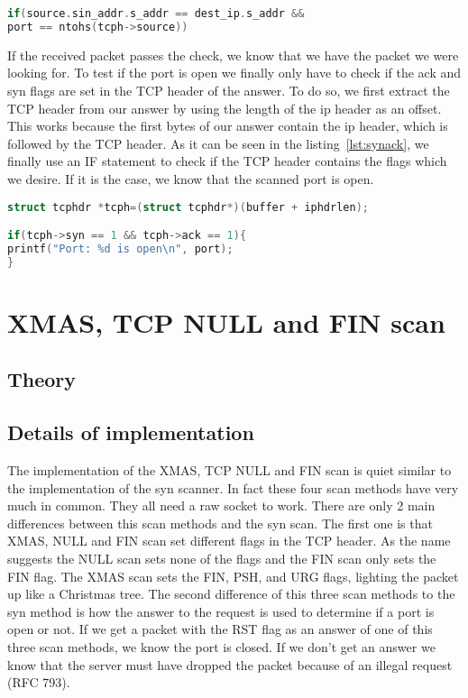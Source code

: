 \begin{lstlisting}[frame= single, language=C, caption= IF statement to check origin of packet, label=lst:checkorigin]
if(source.sin_addr.s_addr == dest_ip.s_addr &&
port == ntohs(tcph->source))
\end{lstlisting}
If the received packet passes the check, we know that we have the packet we were looking for. To test if the port is open we finally only have to check if the ack and syn flags are set in the TCP header
of the answer. To do so, we first extract the TCP header from our answer by using the length of the ip header as an offset. This works because the first bytes of our answer contain the ip header, which
is followed by the TCP header. As it can be seen in the listing~\ref{lst:synack}, we finally use an IF statement to check if the TCP header contains the flags which we desire. If it is the case, we know that the scanned
port is open.
\begin{lstlisting}[frame= single, language=C, caption=C code to check if answer contains syn and ack flag, label=lst:synack]
struct tcphdr *tcph=(struct tcphdr*)(buffer + iphdrlen);

if(tcph->syn == 1 && tcph->ack == 1){
printf("Port: %d is open\n", port);
} 
\end{lstlisting}
\section{XMAS, TCP NULL and FIN scan}
\label{sec:xmas}
\subsection{Theory}

\subsection{Details of implementation}
The implementation of the XMAS, TCP NULL and FIN scan is quiet similar to the implementation of the syn scanner. In fact these four scan methods have very much in common.
They all need a raw socket to work. There are only 2 main differences between this scan methods and the syn scan. The first one is that XMAS, NULL and FIN scan set different flags
in the TCP header. As the name suggests the NULL scan sets none of the flags and the FIN scan only sets the FIN flag. The XMAS scan sets the FIN, PSH, and URG flags, lighting the packet up like a Christmas tree.
The second difference of this three scan methods to the syn method is how the answer to the request is used to determine if a port is open or not. If we get a packet with the RST flag as an answer of one
of this three scan methods, we know the port is closed. If we don't get an answer we know that the server must have dropped the packet because of an illegal request (RFC 793).

		
